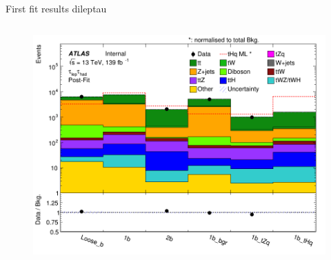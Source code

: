 \begin{frame}{First fit results dileptau}
\begin{columns}
\begin{column}{0.5\textwidth}
\begin{figure}
                \includegraphics[width=\textwidth]{postfit}
            \end{figure}
        \end{column}
    \end{columns}
\end{frame}

